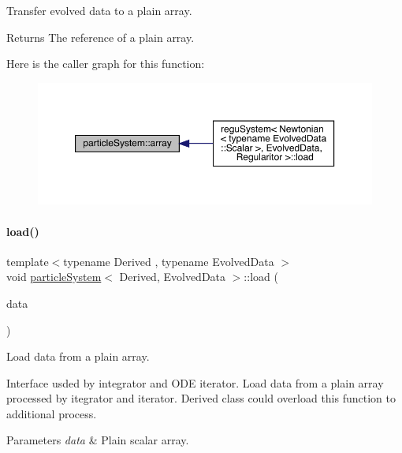 Transfer evolved data to a plain array. 

\begin{DoxyReturn}{Returns}
The reference of a plain array. 
\end{DoxyReturn}
Here is the caller graph for this function\+:\nopagebreak
\begin{figure}[H]
\begin{center}
\leavevmode
\includegraphics[width=350pt]{classparticle_system_a1817956f802188c82c12c223c32bd28a_icgraph}
\end{center}
\end{figure}
\mbox{\label{classparticle_system_a73609eb9d95e01724f9f56cb0d9f7ac7}} 
\paragraph{\texorpdfstring{load()}{load()}}
{\footnotesize\ttfamily template$<$typename Derived , typename Evolved\+Data $>$ \\
void \mbox{\hyperlink{classparticle_system}{particle\+System}}$<$ Derived, Evolved\+Data $>$\+::load (\begin{DoxyParamCaption}\item[{\mbox{\hyperlink{classparticle_system_ae5a7215810a9f2cad5508aca6b26a063}{Plain\+Array}} \&}]{data }\end{DoxyParamCaption})}



Load data from a plain array. 

Interface usded by integrator and O\+DE iterator. Load data from a plain array processed by itegrator and iterator. Derived class could overload this function to additional process.


\begin{DoxyParams}{Parameters}
{\em data} & Plain scalar array. \\
\hline
\end{DoxyParams}
\mbox{\label{classparticle_system_a95f991ac50fde37e7c57dd6feca1e358}} 
